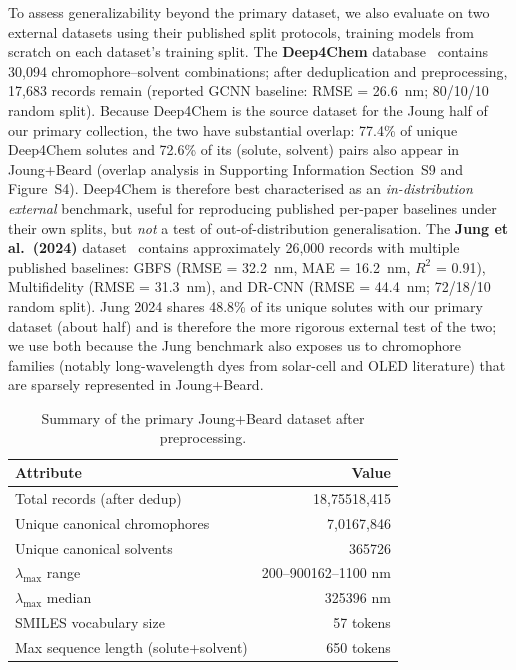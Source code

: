 \documentclass[journal=jcisd8,manuscript=article]{achemso}
\newcommand{\added}[1]{{\color{addedblue}#1}}
\newcommand{\removed}[1]{{\color{removedred}#1}}
\begin{document}
To assess generalizability beyond the primary dataset, we also evaluate on two external datasets using their published split protocols, training models from scratch on each dataset's training split.
The \textbf{Deep4Chem} database~\cite{joung2021deep} contains 30,094 chromophore--solvent combinations; after deduplication and preprocessing, 17,683 records remain (reported GCNN baseline: RMSE = 26.6~nm; 80/10/10 random split). \added{Because Deep4Chem is the source dataset for the Joung half of our primary collection, the two have substantial overlap: 77.4\% of unique Deep4Chem solutes and 72.6\% of its (solute, solvent) pairs also appear in Joung+Beard (overlap analysis in Supporting Information Section~S9 and Figure~S4). Deep4Chem is therefore best characterised as an \emph{in-distribution external} benchmark, useful for reproducing published per-paper baselines under their own splits, but \emph{not} a test of out-of-distribution generalisation.}
The \textbf{Jung et al.\ (2024)} dataset~\cite{jung2024machine} contains approximately 26,000 records with multiple published baselines: GBFS (RMSE = 32.2~nm, MAE = 16.2~nm, $R^2$ = 0.91), Multifidelity (RMSE = 31.3~nm), and DR-CNN (RMSE = 44.4~nm; 72/18/10 random split). \added{Jung 2024 shares 48.8\% of its unique solutes with our primary dataset (about half) and is therefore the more rigorous external test of the two; we use both because the Jung benchmark also exposes us to chromophore families (notably long-wavelength dyes from solar-cell and OLED literature) that are sparsely represented in Joung+Beard.}

\begin{table}[htbp]
\centering
\caption{Summary of the primary Joung+Beard dataset after preprocessing.}
\label{tab:dataset_summary}
\begin{tabular}{lr}
\toprule
\textbf{Attribute} & \textbf{Value} \\
\midrule
Total records \added{(after dedup)} & \removed{18,755}\added{18,415} \\
Unique \added{canonical }chromophores & \removed{7,016}\added{7,846} \\
Unique \added{canonical }solvents & \removed{365}\added{726} \\
$\lambda_{\max}$ range & \removed{200--900}\added{162--1100} nm \\
$\lambda_{\max}$ median & \removed{325}\added{396} nm \\
SMILES vocabulary size & 57 tokens \\
Max sequence length (solute+solvent) & 650 tokens \\
\bottomrule
\end{tabular}
\end{table}
\end{document}

